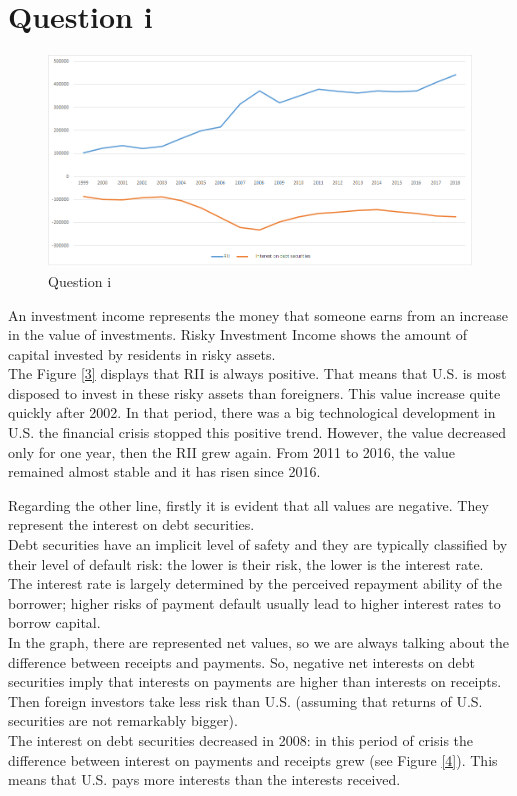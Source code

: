 \documentclass[	11pt, ]{fphw}
\begin{document}
\section*{Question i}

\begin{figure}[h]
\centering 
\includegraphics[scale=0.8]{ass2esi.png} 
\caption{Question i} 
\label{3}
\end{figure}
An investment income represents the money that someone earns from an increase in the value of investments. Risky Investment Income shows the amount of capital invested by residents in risky assets. \\
The Figure \vref{3} displays that RII is always positive. That means that U.S. is most disposed to invest in these risky assets than foreigners. This value increase quite quickly after 2002. In that period, there was a big technological development in U.S.  the financial crisis stopped this positive trend. However, the value decreased only for one year, then the RII grew again. From 2011 to 2016, the value remained almost stable and it has risen since 2016.
\par Regarding the other line, firstly it is evident that all values are negative. They represent the interest on debt securities. \\

Debt securities have an implicit level of safety and they are typically classified by their level of default risk: the lower is their risk,  the lower is the interest rate. The interest rate is largely determined by the perceived repayment ability of the borrower; higher risks of payment default usually lead to higher interest rates to borrow capital. \\
In the graph, there are represented net values, so we are always talking about the difference between receipts and payments. So, negative net interests on debt securities imply that interests on payments are higher than interests on receipts. Then foreign investors take less risk than U.S. (assuming that returns of U.S. securities  are not remarkably bigger). \\
The interest on debt securities decreased in 2008: in this period of crisis the difference between interest on payments and receipts grew (see Figure \vref{4}). This means that U.S. pays more interests than the interests received. 
\end{document}
